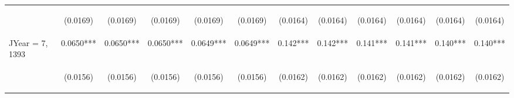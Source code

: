 \documentclass[]{article}
\begin{document}
\begin{center}
\begin{tabular}{lccccccccccc}
\vspace{4pt} & \begin{footnotesize}(0.0169)\end{footnotesize} & \begin{footnotesize}(0.0169)\end{footnotesize} & \begin{footnotesize}(0.0169)\end{footnotesize} & \begin{footnotesize}(0.0169)\end{footnotesize} & \begin{footnotesize}(0.0169)\end{footnotesize} & \begin{footnotesize}(0.0164)\end{footnotesize} & \begin{footnotesize}(0.0164)\end{footnotesize} & \begin{footnotesize}(0.0164)\end{footnotesize} & \begin{footnotesize}(0.0164)\end{footnotesize} & \begin{footnotesize}(0.0164)\end{footnotesize} & \begin{footnotesize}(0.0164)\end{footnotesize} \\
JYear = 7, 1393 & 0.0650*** & 0.0650*** & 0.0650*** & 0.0649*** & 0.0649*** & 0.142*** & 0.142*** & 0.141*** & 0.141*** & 0.140*** & 0.140*** \\
\vspace{4pt} & \begin{footnotesize}(0.0156)\end{footnotesize} & \begin{footnotesize}(0.0156)\end{footnotesize} & \begin{footnotesize}(0.0156)\end{footnotesize} & \begin{footnotesize}(0.0156)\end{footnotesize} & \begin{footnotesize}(0.0156)\end{footnotesize} & \begin{footnotesize}(0.0162)\end{footnotesize} & \begin{footnotesize}(0.0162)\end{footnotesize} & \begin{footnotesize}(0.0162)\end{footnotesize} & \begin{footnotesize}(0.0162)\end{footnotesize} & \begin{footnotesize}(0.0162)\end{footnotesize} & \begin{footnotesize}(0.0162)\end{footnotesize} \\

\end{tabular}
\end{center}
\end{document}
